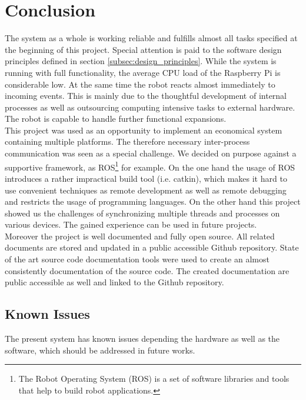 \newpage

\section{Conclusion}

The system as a whole is working reliable and fulfills almost all tasks specified at the beginning of this project. Special attention is paid to the software design principles defined in section \ref{subsec:design_principles}. While the system is running with full functionality, the average CPU load of the Raspberry Pi is considerable low. At the same time the robot reacts almost immediately to incoming events. This is mainly due to the thoughtful development of internal processes as well as outsourcing computing intensive tasks to external hardware. The robot is capable to handle further functional expansions.\\

This project was used as an opportunity to implement an economical system containing multiple platforms. The therefore necessary inter-process communication was seen as a special challenge. We decided on purpose against a supportive framework, as ROS\footnote{The Robot Operating System (ROS) is a set of software libraries and tools that help to build robot applications.} for example. On the one hand the usage of ROS introduces a rather impractical build tool (i.e. catkin), which makes it hard to use convenient techniques as remote development as well as remote debugging and restricts the usage of programming languages. On the other hand this project showed us the challenges of synchronizing multiple threads and processes on various devices. The gained experience can be used in future projects.\\

Moreover the project is well documented and fully open source. All related documents are stored and updated in a public accessible Github repository. State of the art source code documentation tools were used to create an almost consistently documentation of the source code. The created documentation are public accessible as well and linked to the Github repository.

\subsection{Known Issues}

The present system has known issues depending the hardware as well as the software, which should be addressed in future works.\\

